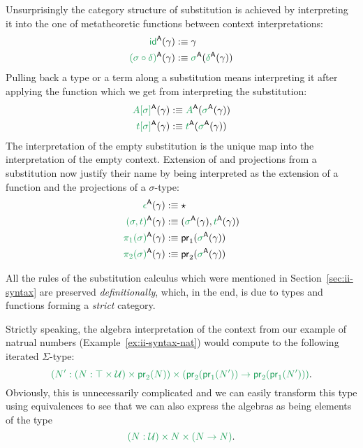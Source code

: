 \begin{defn}
Unsurprisingly the category structure of substitution is achieved by interpreting
it into the one of metatheoretic functions between context interpretations:
\begin{align*}
\grm{\id}^\CC(\gamma)			&:\equiv \gamma \\
\grm{(\sigma \circ \delta)}^\CC(\gamma)	&:\equiv \grm{\sigma}^\CC(\grm{\delta}^\CC(\gamma))
\end{align*}
Pulling back a type or a term along a substitution means interpreting it after
applying the function which we get from interpreting the substitution:
\begin{align*}
\grm{A[\sigma]}^\CC(\gamma)		&:\equiv \grm{A}^\CC(\grm{\sigma}^\CC(\gamma)) \\
\grm{t[\sigma]}^\CC(\gamma)		&:\equiv \grm{t}^\CC(\grm{\sigma}^\CC(\gamma))
\end{align*}
The interpretation of the empty substitution is the unique map into the interpretation
of the empty context.
Extension of and projections from a substitution now justify their name by being
interpreted as the extension of a function and the projections of a $\sigma$-type:
\begin{align*}
\grm{\epsilon}^\CC(\gamma)		&:\equiv \star \\
\grm{(\sigma, t)}^\CC(\gamma)		&:\equiv (\grm{\sigma}^\CC(\gamma), \grm{t}^\CC(\gamma)) \\
\grm{\pi_1(\sigma)}^\CC(\gamma)		&:\equiv \pr_1(\grm{\sigma}^\CC(\gamma)) \\
\grm{\pi_2(\sigma)}^\CC(\gamma)		&:\equiv \pr_2(\grm{\sigma}^\CC(\gamma))
\end{align*}

All the rules of the substitution calculus which were mentioned in Section~\ref{sec:ii-syntax}
are preserved \emph{definitionally}, which, in the end, is due to types and
functions forming a \emph{strict} category. %


\end{defn}

\begin{example}
Strictly speaking, the algebra interpretation of the
context from our example of natrual numbers (Example~\ref{ex:ii-syntax-nat})
would compute to the following iterated $\Sigma$-type:
\begin{equation*}
\grm{\left(N' : (N : \top \times \UU) \times \pr_2(N)\right)
  \times \left(\pr_2(\pr_1(N')) \to \pr_2(\pr_1(N')) \right) } \text{.}
\end{equation*}
Obviously, this is unnecessarily complicated and we can easily transform this
type using equivalences to see that we can also express the algebras as being
elements of the type
\begin{equation*}
\grm{(N : \UU) \times N \times (N \to N)} \text{.}
\end{equation*}
\end{example}

